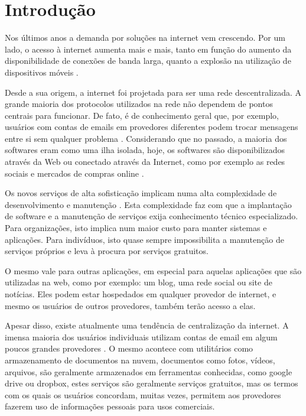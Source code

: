 \chapter{Introdução}
\label{cap-introducao}

Nos últimos anos a demanda por soluções na internet vem crescendo. Por um lado,
o acesso à internet aumenta mais e mais, tanto em
função do aumento da disponibilidade de conexões de banda larga, quanto a
explosão na utilização de dispositivos móveis \cite{shak2015}.

Desde a sua origem, a internet foi projetada para ser uma rede
descentralizada. A grande maioria dos protocolos utilizados na rede não
dependem de pontos centrais para funcionar. De fato, é de conhecimento geral
que, por exemplo, usuários com contas de emails em provedores diferentes podem
trocar mensagens entre si sem qualquer problema \cite{shak2015}. Considerando que no
passado, a maioria dos softwares eram como uma ilha isolada,
hoje, os softwares são disponibilizados através da Web ou conectado através da Internet,
como por exemplo as redes sociais e mercados de compras online \cite{6265084}.

Os novos serviços de alta sofisticação implicam numa alta complexidade de
desenvolvimento e manutenção \cite{shak2015}. Esta complexidade faz com que a
implantação de software e a manutenção de serviços exija conhecimento técnico
especializado. Para organizações, isto implica num maior
custo para manter sistemas e aplicações. Para indivíduos, isto quase sempre
impossibilita a manutenção de serviços próprios e leva à procura por serviços
gratuitos.

O mesmo vale para outras aplicações, em especial para aquelas aplicações
que são utilizadas na web, como por exemplo: um blog, uma rede social ou site de
notícias. Eles podem estar hospedados em qualquer provedor de internet, e mesmo os
usuários de outros provedores, também terão acesso a elas.

Apesar disso, existe atualmente uma tendência de centralização da internet.
A imensa maioria dos usuários individuais utilizam contas de email em algum
poucos grandes provedores \cite{shak2015}. O mesmo acontece com utilitários como armazenamento
de documentos na nuvem, documentos como fotos, vídeos, arquivos, são geralmente
armazenados em ferramentas conhecidas, como google drive ou dropbox, estes serviços
são geralmente serviços gratuitos, mas os termos com os quais os usuários concordam, muitas vezes,
permitem aos provedores fazerem uso de informações pessoais para usos comerciais.

